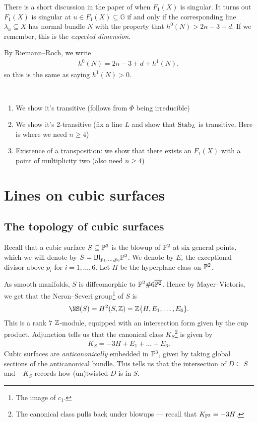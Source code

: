 \documentclass[11pt]{amsart}
\begin{document}
\begin{remark} There is a short discussion in the paper of when $F_1(X)$ is singular. It turns out $F_1(X)$ is singular at $u \in F_1(X) \subseteq \mathbb{G}$ if and only if the corresponding line $\lambda_u \subseteq X$ has normal bundle $N$ with the property that $h^0(N) > 2n-3+d$. If we remember, this is the \textit{expected dimension}.

By Riemann--Roch, we write
\begin{align*}
    h^0(N) = 2n-3+d + h^1(N),
\end{align*}
so this is the same as saying $h^1(N)>0$.
\end{remark}

\begin{remark} \,
\begin{enumerate}
    \item We show it's transitive (follows from $\Phi$ being irreducible)
    \item We show it's 2-transitive (fix a line $L$ and show that $\Stab_L$ is transitive. Here is where we need $n\ge 4$)
    \item Existence of a transposition: we show that there exists an $F_1(X)$ with a point of multiplicity two (also need $n\ge4$)
\end{enumerate}
\end{remark}

\section{Lines on cubic surfaces}

\subsection{The topology of cubic surfaces}

Recall that a cubic surface $S \subseteq \P^3$ is the blowup of $\P^2$ at six general points, which we will denote by $S = \Bl_{p_1, \ldots, p_6}\P^2$. We denote by $E_i$ the exceptional divisor above $p_i$ for $i=1, \ldots, 6$. Let $H$ be the hyperplane class on $\P^2$.

As smooth manifolds, $S$ is diffeomorphic to $\P^2\# 6\overline{\P^2}$. Hence by Mayer--Vietoris, we get that the Neron--Severi group\footnote{The image of $c_1$.} of $S$ is 
\begin{align*}
    \NS(S) = H^2(S,\Z) = \Z\{H,E_1, \ldots, E_6\}.
\end{align*}
This is a rank 7 $\Z$-module, equipped with an intersection form given by the cup product. Adjunction tells us that the canonical class $K_S$\footnote{The canonical class pulls back under blowups --- recall that $K_{\P^2} = -3H$.} is given by
\begin{align*}
    K_S = -3H + E_1 + \ldots + E_6.
\end{align*}
Cubic surfaces are \textit{anticanonically} embedded in $\P^3$, given by taking global sections of the anticanonical bundle. This tells us that the intersection of $D \subseteq S$ and $-K_S$ records how (un)twisted $D$ is in $S$.
\end{document}
